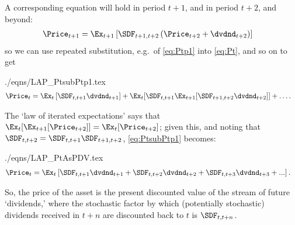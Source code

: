 \documentclass{handout}
\begin{document}
A corresponding equation will hold in period $t+1$, and in period $t+2$, and beyond:
\begin{equation}\begin{gathered}\begin{aligned}
 \Price_{t+1} & =  \Ex_{t+1}\left[\SDF_{t+1,t+2}\left({\Price}_{t+2}+\dvdnd_{t+2}\right)\right] \label{eq:Ptp1}
\end{aligned}\end{gathered}\end{equation}
so we can use repeated substitution, e.g.\ of \eqref{eq:Ptp1} into \eqref{eq:Pt}, and so on to get
\begin{verbatimwrite}{./eqns/LAP_PtsubPtp1.tex}
\begin{equation}\begin{gathered}\begin{aligned}
 \Price_{t} & =  \Ex_{t}\left[\SDF_{t,t+1}\dvdnd_{t+1}\right]+\Ex_{t}[\SDF_{t,t+1}\Ex_{t+1}[\SDF_{t+1,t+2}\dvdnd_{t+2}]]+ \ldots \label{eq:PtsubPtp1}
.
\end{aligned}\end{gathered}\end{equation}
\end{verbatimwrite}


The `law of iterated expectations' says that
$\Ex_{t}[\Ex_{t+1}[{\Price}_{t+2}]] = \Ex_{t}[{\Price}_{t+2}]$;
given this, and noting that $\SDF_{t,t+2} = \SDF_{t,t+1}\SDF_{t+1,t+2}$, \eqref{eq:PtsubPtp1} becomes:
\begin{verbatimwrite}{./eqns/LAP_PtAsPDV.tex}
\begin{equation}\begin{gathered}\begin{aligned}
 \Price_{t} & =  \Ex_{t}\left[\SDF_{t,t+1}\dvdnd_{t+1}+\SDF_{t,t+2}\dvdnd_{t+2}+\SDF_{t,t+3}\dvdnd_{t+3}+...\right] . \label{eq:PtAsPDV}
\end{aligned}\end{gathered}\end{equation}
\end{verbatimwrite}

So, the price of the asset is the present discounted value of the stream of future `dividends,'
where the stochastic factor by which (potentially stochastic) dividends received in $t+n$ are discounted back to $t$ is $\SDF_{t,t+n}$.
\end{document}
